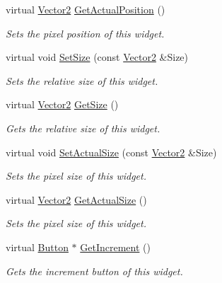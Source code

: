 \begin{DoxyCompactItemize}
virtual \hyperlink{classphys_1_1Vector2}{Vector2} \hyperlink{classphys_1_1UI_1_1Spinner_a7ee24e3f5c11550950696a2c9094d716}{GetActualPosition} ()
\begin{DoxyCompactList}\small\item\em Sets the pixel position of this widget. \item\end{DoxyCompactList}\item 
virtual void \hyperlink{classphys_1_1UI_1_1Spinner_a01641c5ed2b360307f3056f142964bf4}{SetSize} (const \hyperlink{classphys_1_1Vector2}{Vector2} \&Size)
\begin{DoxyCompactList}\small\item\em Sets the relative size of this widget. \item\end{DoxyCompactList}\item 
virtual \hyperlink{classphys_1_1Vector2}{Vector2} \hyperlink{classphys_1_1UI_1_1Spinner_a670d8ff577a8feb6df6f507843f08756}{GetSize} ()
\begin{DoxyCompactList}\small\item\em Gets the relative size of this widget. \item\end{DoxyCompactList}\item 
virtual void \hyperlink{classphys_1_1UI_1_1Spinner_a564782cd7135a708295c51e722f22716}{SetActualSize} (const \hyperlink{classphys_1_1Vector2}{Vector2} \&Size)
\begin{DoxyCompactList}\small\item\em Sets the pixel size of this widget. \item\end{DoxyCompactList}\item 
virtual \hyperlink{classphys_1_1Vector2}{Vector2} \hyperlink{classphys_1_1UI_1_1Spinner_af2843083a652f2d7ca6e929582f501fd}{GetActualSize} ()
\begin{DoxyCompactList}\small\item\em Sets the pixel size of this widget. \item\end{DoxyCompactList}\item 
virtual \hyperlink{classphys_1_1UI_1_1Button}{Button} $\ast$ \hyperlink{classphys_1_1UI_1_1Spinner_a2263f427c90b21a208bf0a6bfb3d2201}{GetIncrement} ()
\begin{DoxyCompactList}\small\item\em Gets the increment button of this widget. \item\end{DoxyCompactList}\item 

\end{DoxyCompactItemize}
